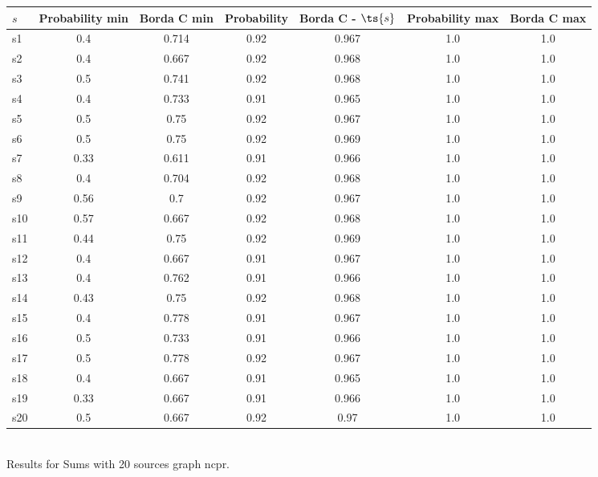 \documentclass{article}
\begin{document}
\noindent\begin{tabular}{|l|c|c|c|c|c|c|}
\hline
$s$& Probability min & Borda C min & Probability & Borda C - $\ts{s}$ & Probability max & Borda C max\\
\hline
s1 &0.4 & 0.714 & 0.92 & 0.967 & 1.0 & 1.0\\
\hline
s2 &0.4 & 0.667 & 0.92 & 0.968 & 1.0 & 1.0\\
\hline
s3 &0.5 & 0.741 & 0.92 & 0.968 & 1.0 & 1.0\\
\hline
s4 &0.4 & 0.733 & 0.91 & 0.965 & 1.0 & 1.0\\
\hline
s5 &0.5 & 0.75 & 0.92 & 0.967 & 1.0 & 1.0\\
\hline
s6 &0.5 & 0.75 & 0.92 & 0.969 & 1.0 & 1.0\\
\hline
s7 &0.33 & 0.611 & 0.91 & 0.966 & 1.0 & 1.0\\
\hline
s8 &0.4 & 0.704 & 0.92 & 0.968 & 1.0 & 1.0\\
\hline
s9 &0.56 & 0.7 & 0.92 & 0.967 & 1.0 & 1.0\\
\hline
s10 &0.57 & 0.667 & 0.92 & 0.968 & 1.0 & 1.0\\
\hline
s11 &0.44 & 0.75 & 0.92 & 0.969 & 1.0 & 1.0\\
\hline
s12 &0.4 & 0.667 & 0.91 & 0.967 & 1.0 & 1.0\\
\hline
s13 &0.4 & 0.762 & 0.91 & 0.966 & 1.0 & 1.0\\
\hline
s14 &0.43 & 0.75 & 0.92 & 0.968 & 1.0 & 1.0\\
\hline
s15 &0.4 & 0.778 & 0.91 & 0.967 & 1.0 & 1.0\\
\hline
s16 &0.5 & 0.733 & 0.91 & 0.966 & 1.0 & 1.0\\
\hline
s17 &0.5 & 0.778 & 0.92 & 0.967 & 1.0 & 1.0\\
\hline
s18 &0.4 & 0.667 & 0.91 & 0.965 & 1.0 & 1.0\\
\hline
s19 &0.33 & 0.667 & 0.91 & 0.966 & 1.0 & 1.0\\
\hline
s20 &0.5 & 0.667 & 0.92 & 0.97 & 1.0 & 1.0\\
\hline
\end{tabular}\\

\noindent Results for Sums with 20 sources graph ncpr.
\end{document}
